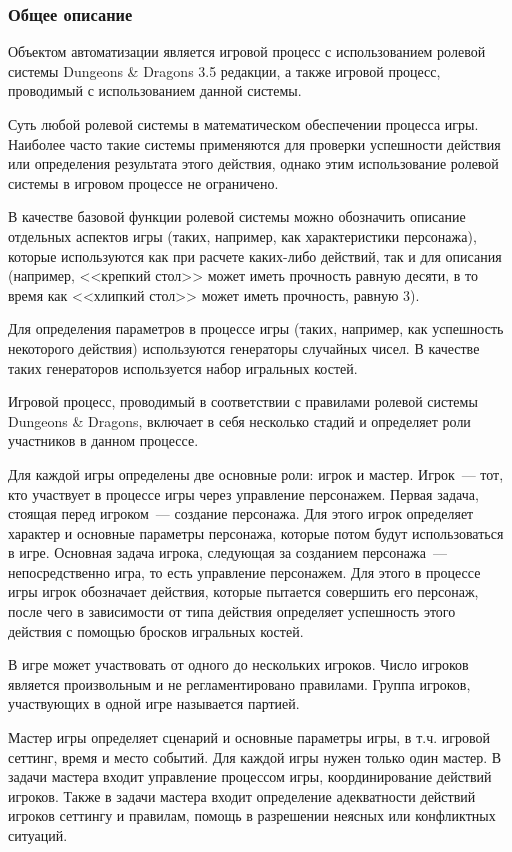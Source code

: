 \subsubsection{Общее описание}

Объектом автоматизации является игровой процесс с использованием ролевой системы Dungeons \& Dragons 3.5 редакции, а также игровой процесс, проводимый с использованием данной системы.

Суть любой ролевой системы в математическом обеспечении процесса игры. Наиболее часто такие системы применяются для проверки успешности действия или определения результата этого действия, однако этим использование ролевой системы в игровом процессе не ограничено.

В качестве базовой функции ролевой системы можно обозначить описание отдельных аспектов игры (таких, например, как характеристики персонажа), которые используются как при расчете каких-либо действий, так и для описания (например, <<крепкий стол>> может иметь прочность равную десяти, в то время как <<хлипкий стол>> может иметь прочность, равную 3).

Для определения параметров в процессе игры (таких, например, как успешность некоторого действия) используются генераторы случайных чисел. В качестве таких генераторов используется набор игральных костей.

Игровой процесс, проводимый в соответствии с правилами ролевой системы Dungeons \& Dragons, включает в себя несколько стадий и определяет роли участников в данном процессе.

Для каждой игры определены две основные роли: игрок и мастер. Игрок~--- тот, кто участвует в процессе игры через управление персонажем. Первая задача, стоящая перед игроком~--- создание персонажа. Для этого игрок определяет характер и основные параметры персонажа, которые потом будут использоваться в игре. Основная задача игрока, следующая за созданием персонажа~--- непосредственно игра, то есть управление персонажем. Для этого в процессе игры игрок обозначает действия, которые пытается совершить его персонаж, после чего в зависимости от типа действия определяет успешность этого действия с помощью бросков игральных костей.

В игре может участвовать от одного до нескольких игроков. Число игроков является произвольным и не регламентировано правилами. Группа игроков, участвующих в одной игре называется партией.

Мастер игры определяет сценарий и основные параметры игры, в т.ч. игровой сеттинг, время и место событий. Для каждой игры нужен только один мастер. В задачи мастера входит управление процессом игры, координирование действий игроков. Также в задачи мастера входит определение адекватности действий игроков сеттингу и правилам, помощь в разрешении неясных или конфликтных ситуаций.

